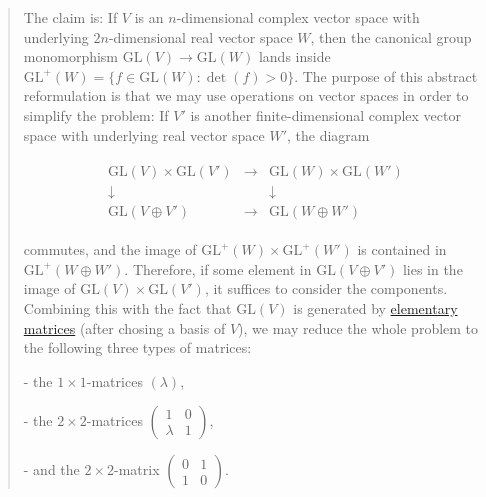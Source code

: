 \documentclass{article}
\numberwithin{equation}{subsection} %
\theoremstyle{definition}
\begin{document}
    \begin{quote}
        The claim is: If $V$ is an $n$-dimensional complex vector space with underlying $2n$-dimensional real vector space $W$, then the canonical group monomorphism $\mathrm{GL}(V) \to \mathrm{GL}(W)$ lands inside $\mathrm{GL}^+(W)=\{f \in \mathrm{GL}(W) : \det(f)>0\}$.  The purpose of this abstract reformulation is that we may use operations on vector spaces in order to simplify the problem: If $V'$ is another finite-dimensional complex vector space with underlying real vector space $W'$, the diagram

        \begin{align}
          \begin{array}{ccc} 
            \mathrm{GL}(V) \times \mathrm{GL}(V') & \rightarrow & \mathrm{GL}(W) \times \mathrm{GL}(W') \\
            \downarrow & & \downarrow \\ 
            \mathrm{GL}(V \oplus V') & \rightarrow & \mathrm{GL}(W \oplus W') 
          \end{array}
        \end{align}

        commutes, and the image of $\mathrm{GL}^+(W) \times \mathrm{GL}^+(W')$  is contained in $\mathrm{GL}^+(W \oplus W')$. Therefore, if some element in $\mathrm{GL}(V \oplus V')$ lies in the image of $\mathrm{GL}(V) \times \mathrm{GL}(V')$, it suffices to consider the components. Combining this with the fact that $\mathrm{GL}(V)$ is generated by \href{https://en.wikipedia.org/wiki/Elementary_matrix}{elementary matrices} (after chosing a basis of $V$), we may reduce the whole problem to the following three types of matrices:

        - the $1 \times 1$-matrices $(\lambda)$,

        - the $2 \times 2$-matrices $\begin{pmatrix} 1 & 0 \\ \lambda & 1 \end{pmatrix}$,

        - and the $2 \times 2$-matrix $\begin{pmatrix} 0 & 1 \\ 1 & 0 \end{pmatrix}$.


\end{quote}
\end{document}
